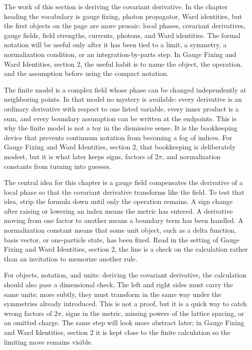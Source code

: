 The work of this section is deriving the covariant derivative.  In the chapter heading the vocabulary is gauge fixing, photon propagator, Ward identities, but the first objects on the page are more prosaic: local phases, covariant derivatives, gauge fields, field strengths, currents, photons, and Ward identities.  The formal notation will be useful only after it has been tied to a limit, a symmetry, a normalization condition, or an integration-by-parts step.  In Gauge Fixing and Ward Identities, section 2, the useful habit is to name the object, the operation, and the assumption before using the compact notation.

The finite model is a complex field whose phase can be changed independently at neighboring points.  In that model no mystery is available: every derivative is an ordinary derivative with respect to one listed variable, every inner product is a sum, and every boundary assumption can be written at the endpoints.  This is why the finite model is not a toy in the dismissive sense.  It is the bookkeeping device that prevents continuum notation from becoming a fog of indices.  For Gauge Fixing and Ward Identities, section 2, that bookkeeping is deliberately modest, but it is what later keeps signs, factors of \(2\pi\), and normalization constants from turning into guesses.

The central idea for this chapter is a gauge field compensates the derivative of a local phase so that the covariant derivative transforms like the field.  To test that idea, strip the formula down until only the operation remains.  A sign change after raising or lowering an index means the metric has entered.  A derivative moving from one factor to another means a boundary term has been handled.  A normalization constant means that some unit object, such as a delta function, basis vector, or one-particle state, has been fixed.  Read in the setting of Gauge Fixing and Ward Identities, section 2, the line is a check on the calculation rather than an invitation to memorize another rule.

For objects, notation, and units: deriving the covariant derivative, the calculation should also pass a dimensional check.  The left and right sides must carry the same units; more subtly, they must transform in the same way under the symmetries already introduced.  This is not a proof, but it is a quick way to catch wrong factors of \(2\pi\), signs in the metric, missing powers of the lattice spacing, or an omitted charge.  The same step will look more abstract later; in Gauge Fixing and Ward Identities, section 2 it is kept close to the finite calculation so the limiting move remains visible.

